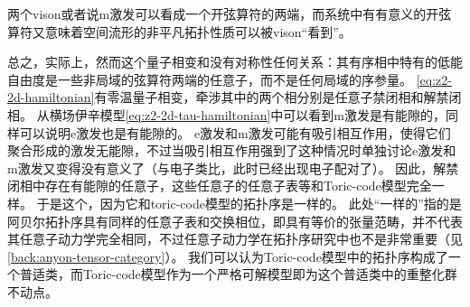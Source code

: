 两个vison或者说m激发可以看成一个开弦算符的两端，而系统中有有意义的开弦算符又意味着空间流形的非平凡拓扑性质可以被vison“看到”。

总之，实际上，然而这个量子相变和没有对称性任何关系：其有序相中特有的低能自由度是一些非局域的弦算符两端的任意子，而不是任何局域的序参量。
\eqref{eq:z2-2d-hamiltonian}有零温量子相变，牵涉其中的两个相分别是任意子禁闭相和解禁闭相。
从横场伊辛模型\eqref{eq:z2-2d-tau-hamiltonian}中可以看到m激发是有能隙的，同样可以说明e激发也是有能隙的。
e激发和m激发可能有吸引相互作用，使得它们聚合形成的激发无能隙，不过当吸引相互作用强到了这种情况时单独讨论e激发和m激发又变得没有意义了（与电子类比，此时已经出现电子配对了）。
因此，解禁闭相中存在有能隙的任意子，这些任意子的任意子表等和Toric-code模型完全一样。
于是这个，因为它和toric-code模型的拓扑序是一样的。
此处“一样的”指的是阿贝尔拓扑序具有同样的任意子表和交换相位，即具有等价的张量范畴，并不代表其任意子动力学完全相同，不过任意子动力学在拓扑序研究中也不是非常重要（见\autoref{back:anyon-tensor-category}）。
我们可以认为Toric-code模型中的拓扑序构成了一个普适类，而Toric-code模型作为一个严格可解模型即为这个普适类中的重整化群不动点。



